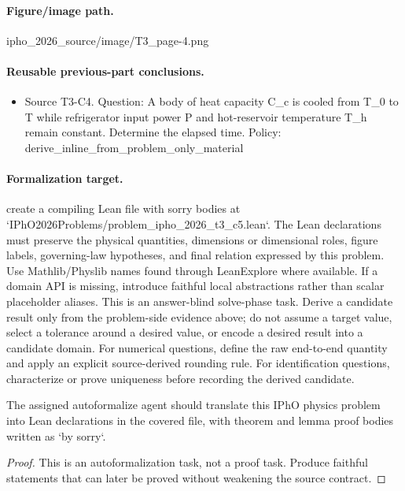 \paragraph{Figure/image path.}
ipho\_2026\_source/image/T3\_page-4.png

\paragraph{Reusable previous-part conclusions.}
\begin{itemize}
\item Source T3-C4. Question: A body of heat capacity C\_c is cooled from T\_0 to T while refrigerator input power P and hot-reservoir temperature T\_h remain constant. Determine the elapsed time. Policy: derive\_inline\_from\_problem\_only\_material
\end{itemize}

\paragraph{Formalization target.}
create a compiling Lean file with sorry bodies at `IPhO2026Problems/problem\_ipho\_2026\_t3\_c5.lean`.
The Lean declarations must preserve the physical quantities, dimensions or dimensional roles, figure labels, governing-law hypotheses, and final relation expressed by this problem.
Use Mathlib/Physlib names found through LeanExplore where available. If a domain API is missing, introduce faithful local abstractions rather than scalar placeholder aliases.
This is an answer-blind solve-phase task. Derive a candidate result only from the problem-side evidence above; do not assume a target value, select a tolerance around a desired value, or encode a desired result into a candidate domain.
For numerical questions, define the raw end-to-end quantity and apply an explicit source-derived rounding rule. For identification questions, characterize or prove uniqueness before recording the derived candidate.

\begin{theorem}
\label{thm:physics:ipho_2026_t3_c5:target}
The assigned autoformalize agent should translate this IPhO physics problem into Lean declarations in the covered file, with theorem and lemma proof bodies written as `by sorry`.
\end{theorem}
\begin{proof}
This is an autoformalization task, not a proof task. Produce faithful statements that can later be proved without weakening the source contract.
\end{proof}
